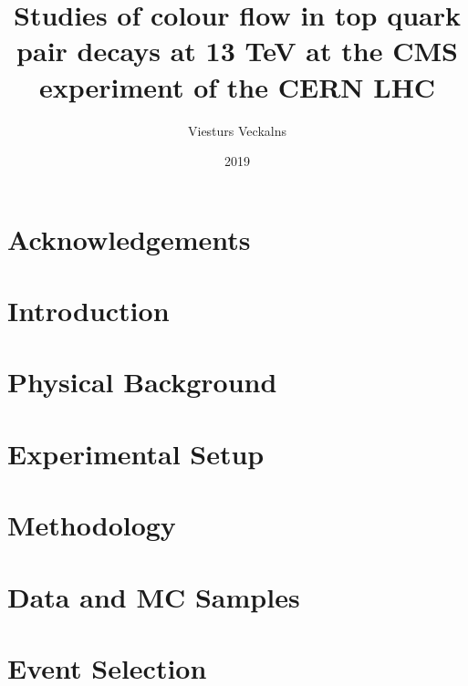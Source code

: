 \documentclass[titlepage, a4paper, EN, FULL]{mythesis}
\title{Studies of colour flow in top quark pair decays at 13 TeV at the CMS experiment of the CERN LHC}
\author{Viesturs Veckalns}
\date{2019}
\begin{document}
\maketitle
\begin{abstract}
        
\end{abstract}
\renewcommand{\abstractname}{Anotācija}

\begin{abstract}
        
\end{abstract}
\chapter*{Acknowledgements}
\label{chap:acknowledgements}


\tableofcontents
\listoffigures
\listoftables

\chapter{Introduction}
\label{chap:introduction}


\chapter{Physical Background}


\chapter{Experimental Setup}


\chapter{Methodology}
\label{chap:methodology}


\chapter{Data and MC Samples}
\label{chap:data_and_mc_samples}


\chapter{Event Selection}
\label{chap:event_selection}

\end{document}
